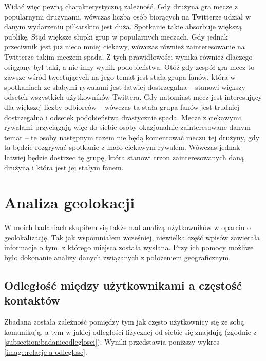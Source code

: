 Widać więc pewną charakterystyczną zależność. Gdy drużyna gra mecze z popularnymi
drużynami, wówczas liczba osób biorących na Twitterze udział w danym wydarzeniu
piłkarskim jest duża. Spotkanie takie absorbuje większą publikę. Stąd
większe słupki grup w popularnych meczach. Gdy jednak przeciwnik jest już nieco
mniej ciekawy, wówczas również zainteresowanie na Twitterze takim meczem spada.
Z tych prawidłowości wynika również dlaczego osiągany był taki, a nie inny
wynik podobieństwa. Otóż gdy zespół gra mecz to zawsze
wśród tweetujących na jego temat jest stała grupa fanów, która w spotkaniach
ze słabymi rywalami jest łatwiej dostrzegalna -- stanowi większy odsetek
wszystkich użytkowników Twittera. Gdy natomiast mecz jest interesujący
dla większej liczby odbiorców -- wówczas ta stała grupa fanów jest trudniej
dostrzegalna i odsetek podobieństwa drastycznie spada.
Mecze z ciekawymi rywalami przyciągają więc do siebie osoby okazjonalnie zainteresowane
danym temat -- te osoby następnym razem nie będą komentować meczu tej drużyny,
gdy ta będzie rozgrywać spotkanie z mało ciekawym rywalem. 
Wówczas jednak łatwiej będzie dostrzec tę grupę, która stanowi trzon zainteresowanych
daną drużyną i która jest jej stałym fanem.














\section{Analiza geolokacji}
\label{section:analizageograficzna}

W moich badaniach skupiłem się także nad analizą użytkowników w oparciu 
o geolokalizację. Tak jak wspomniałem wcześniej, niewielka część wpisów
zawierała informacje o tym, z którego miejsca została wysłana.
Przy ich pomocy możliwe było dokonanie analizy danych związanych z położeniem
geograficznym.

\subsection{Odległość między użytkownikami a częstość kontaktów}
\label{subsection:odlegloscmiedzyuzytkownikami}
Zbadana została zależność pomiędzy tym jak często użytkownicy się ze sobą
komunikują, a tym w jakiej odległości fizycznej od siebie się znajdują (zgodnie
z \ref{subsection:badanieodleglosci}). Wyniki przedstawia poniższy wykres
\ref{image:relacje-a-odleglosc}.


